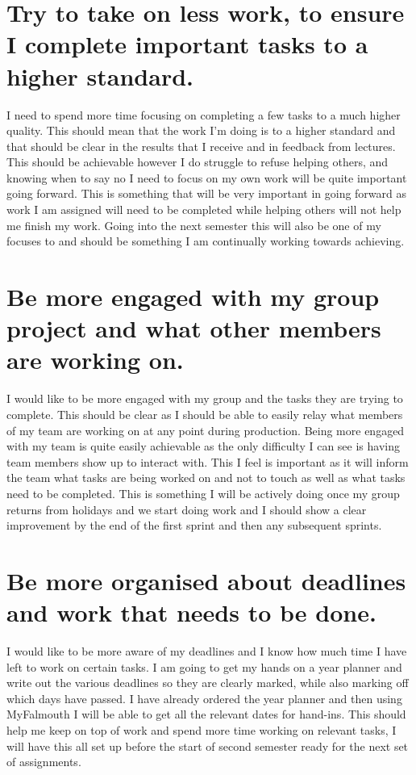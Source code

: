 \documentclass{scrartcl}
\begin{document}
\section{Try to take on less work, to ensure I complete important tasks to a higher standard.}

I need to spend more time focusing on completing a few tasks to a much higher quality. This should mean that the work I'm doing is to a higher standard and that should be clear in the results that I receive and in feedback from lectures. This should be achievable however I do struggle to refuse helping others, and knowing when to say no I need to focus on my own work will be quite important going forward. This is something that will be very important in going forward as work I am assigned will need to be completed while helping others will not help me finish my work. Going into the next semester this will also be one of my focuses to and should be something I am continually working towards achieving.

\section{Be more engaged with my group project and what other members are working on.}

I would like to be more engaged with my group and the tasks they are trying to complete. This should be clear as I should be able to easily relay what members of my team are working on at any point during production. Being more engaged with my team is quite easily achievable as the only difficulty I can see is having team members show up to interact with. This I feel is important as it will inform the team what tasks are being worked on and not to touch as well as what tasks need to be completed. This is something I will be actively doing once my group returns from holidays and we start doing work and I should show a clear improvement by the end of the first sprint and then any subsequent sprints.


\section{Be more organised about deadlines and work that needs to be done.}

I would like to be more aware of my deadlines and I know how much time I have left to work on certain tasks. I am going to get my hands on a year planner and write out the various deadlines so they are clearly marked, while also marking off which days have passed. I have already ordered the year planner and then using MyFalmouth I will be able to get all the relevant dates for hand-ins. This should help me keep on top of work and spend more time working on relevant tasks, I will have this all set up before the start of second semester ready for the next set of assignments.
\end{document}
